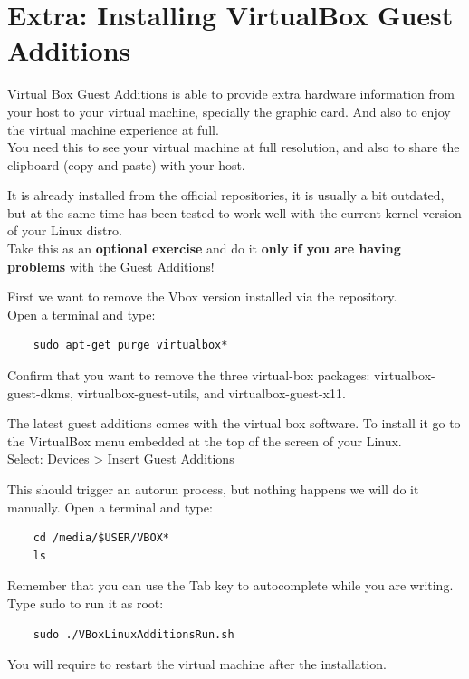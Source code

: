 \documentclass[a4paper]{article}
\begin{document}
\section{Extra: Installing VirtualBox Guest Additions}
Virtual Box Guest Additions is able to provide extra hardware information from your host to your virtual machine, specially the graphic card. And also to enjoy the virtual machine experience at full.\\
\noindent
You need this to see your virtual machine at full resolution, and also to share the clipboard (copy and paste) with your host.

It is already installed from the official repositories, it is usually a bit outdated, but at the same time has been tested to work well with the current kernel version of your Linux distro.\\
Take this as an \textbf{optional exercise} and do it \textbf{only if you are having problems} with the Guest Additions!

First we want to remove the Vbox version installed via the repository.\\
Open a terminal and type:
\begin{lstlisting}
    sudo apt-get purge virtualbox*
\end{lstlisting}
Confirm that you want to remove the three virtual-box packages: virtualbox-guest-dkms, virtualbox-guest-utils, and virtualbox-guest-x11.

The latest guest additions comes with the virtual box software. To install it go to the VirtualBox menu embedded at the top of the screen of your Linux.\\
\noindent Select: Devices > Insert Guest Additions

\noindent This should trigger an autorun process, but nothing happens we will do it manually. Open a terminal and type:

\begin{lstlisting}
    cd /media/$USER/VBOX*
    ls
\end{lstlisting}

Remember that you can use the Tab key to autocomplete while you are writing.\\

Type sudo to run it as root:

\begin{lstlisting}
    sudo ./VBoxLinuxAdditionsRun.sh
\end{lstlisting}

\noindent You will require to restart the virtual machine after the installation.
\end{document}
